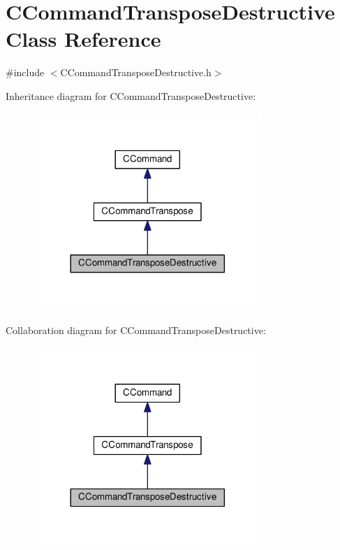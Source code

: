 \hypertarget{classCCommandTransposeDestructive}{}\section{C\+Command\+Transpose\+Destructive Class Reference}
\label{classCCommandTransposeDestructive}


{\ttfamily \#include $<$C\+Command\+Transpose\+Destructive.\+h$>$}



Inheritance diagram for C\+Command\+Transpose\+Destructive\+:
\nopagebreak
\begin{figure}[H]
\begin{center}
\leavevmode
\includegraphics[width=245pt]{classCCommandTransposeDestructive__inherit__graph}
\end{center}
\end{figure}


Collaboration diagram for C\+Command\+Transpose\+Destructive\+:
\nopagebreak
\begin{figure}[H]
\begin{center}
\leavevmode
\includegraphics[width=245pt]{classCCommandTransposeDestructive__coll__graph}
\end{center}
\end{figure}
